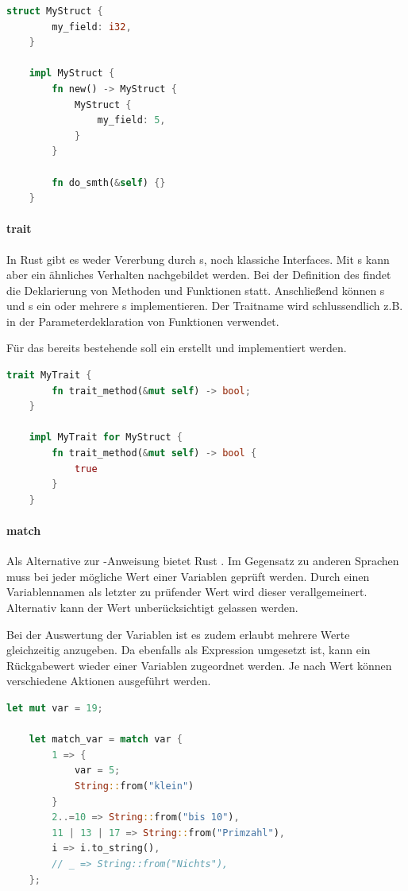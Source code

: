 \documentclass[11pt,a4paper, ngerman]{article}
\begin{document}
\begin{lstlisting}[language=rust, caption={struct}]
    struct MyStruct {
        my_field: i32,
    }

    impl MyStruct {
        fn new() -> MyStruct {
            MyStruct {
                my_field: 5,
            }
        }

        fn do_smth(&self) {}
    }
\end{lstlisting}
\paragraph{trait} In Rust gibt es weder Vererbung durch s, noch klassiche Interfaces. Mit s kann aber ein ähnliches Verhalten nachgebildet werden. Bei der Definition des  findet die Deklarierung von Methoden und Funktionen statt. Anschließend können s und s ein oder mehrere s implementieren. Der Traitname wird schlussendlich z.B. in der Parameterdeklaration von Funktionen verwendet.

Für das bereits bestehende  soll ein  erstellt und implementiert werden.

\begin{lstlisting}[language=rust, caption={trait}]
    trait MyTrait {
        fn trait_method(&mut self) -> bool;
    }

    impl MyTrait for MyStruct {
        fn trait_method(&mut self) -> bool {
            true
        }
    }
\end{lstlisting}
\paragraph{match} Als Alternative zur -Anweisung bietet Rust . Im Gegensatz zu anderen Sprachen muss bei  jeder mögliche Wert einer Variablen geprüft werden. Durch einen Variablennamen als letzter zu prüfender Wert wird dieser verallgemeinert. Alternativ kann der Wert unberücksichtigt gelassen werden.

Bei der Auswertung der Variablen ist es zudem erlaubt mehrere Werte gleichzeitig anzugeben. Da  ebenfalls als Expression umgesetzt ist, kann ein Rückgabewert wieder einer Variablen zugeordnet werden. Je nach Wert können verschiedene Aktionen ausgeführt werden.

\newpage

\begin{lstlisting}[language=rust, caption={match}]
    let mut var = 19;

    let match_var = match var {
        1 => {
            var = 5;
            String::from("klein")
        }
        2..=10 => String::from("bis 10"),
        11 | 13 | 17 => String::from("Primzahl"),
        i => i.to_string(),
        // _ => String::from("Nichts"),
    };
\end{lstlisting}
\end{document}
